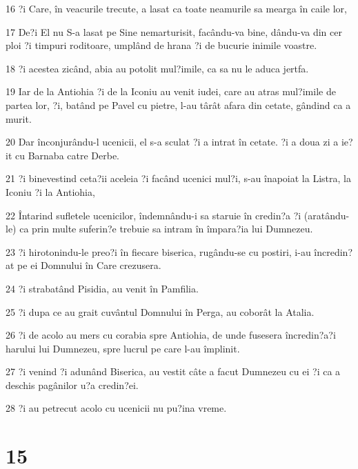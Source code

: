 \par 16 ?i Care, în veacurile trecute, a lasat ca toate neamurile sa mearga în caile lor,
\par 17 De?i El nu S-a lasat pe Sine nemarturisit, facându-va bine, dându-va din cer ploi ?i timpuri roditoare, umplând de hrana ?i de bucurie inimile voastre.
\par 18 ?i acestea zicând, abia au potolit mul?imile, ca sa nu le aduca jertfa.
\par 19 Iar de la Antiohia ?i de la Iconiu au venit iudei, care au atras mul?imile de partea lor, ?i, batând pe Pavel cu pietre, l-au târât afara din cetate, gândind ca a murit.
\par 20 Dar înconjurându-l ucenicii, el s-a sculat ?i a intrat în cetate. ?i a doua zi a ie?it cu Barnaba catre Derbe.
\par 21 ?i binevestind ceta?ii aceleia ?i facând ucenici mul?i, s-au înapoiat la Listra, la Iconiu ?i la Antiohia,
\par 22 Întarind sufletele ucenicilor, îndemnându-i sa staruie în credin?a ?i (aratându-le) ca prin multe suferin?e trebuie sa intram în împara?ia lui Dumnezeu.
\par 23 ?i hirotonindu-le preo?i în fiecare biserica, rugându-se cu postiri, i-au încredin?at pe ei Domnului în Care crezusera.
\par 24 ?i strabatând Pisidia, au venit în Pamfilia.
\par 25 ?i dupa ce au grait cuvântul Domnului în Perga, au coborât la Atalia.
\par 26 ?i de acolo au mers cu corabia spre Antiohia, de unde fusesera încredin?a?i harului lui Dumnezeu, spre lucrul pe care l-au împlinit.
\par 27 ?i venind ?i adunând Biserica, au vestit câte a facut Dumnezeu cu ei ?i ca a deschis pagânilor u?a credin?ei.
\par 28 ?i au petrecut acolo cu ucenicii nu pu?ina vreme.

\chapter{15}


